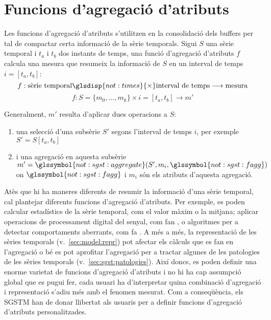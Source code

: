 
\section{Funcions d'agregació d'atributs}
\label{sec:model:interpolador}
\label{sec:model:agregador}


Les funcions d'agregació d'atributs s'utilitzen en la consolidació
dels buffers per tal de compactar certa informació de la sèrie
temporals. Sigui $S$ una sèrie temporal i $t_a$ i $t_b$ dos instants
de temps, una funció d'agregació d'atributs $f$ calcula una mesura que
resumeix la informació de $S$ en un interval de temps $i=[t_a,t_b]$:
\[
f: \text{sèrie temporal} \glsdisp{not:times}{\times}
\text{interval de temps} \longrightarrow \text{mesura}
\]
\[
f: S=\{m_0,\dotsc,m_k\} \times i=[t_a,t_b] \longrightarrow  m'
\]


Generalment, $m'$ resulta d'aplicar dues operacions a $S$: 
\begin{enumerate}
\item una selecció d'una subsèrie $S'$ segons l'interval de temps $i$,
  per exemple $S' = S[t_a,t_b]$
\item i una agregació en aquesta subsèrie $m' =
  \glssymbol{not:sgst:aggregate}(S',m_i,\glssymbol{not:sgst:fagg})$ on
  $\glssymbol{not:sgst:fagg}$ i $m_i$ són els atributs d'aquesta agregació.
\end{enumerate}



Atès que hi ha maneres diferents de resumir la informació d'una sèrie
temporal, cal plantejar diferents funcions d'agregació d'atributs. Per
exemple, es poden calcular estadístics de la sèrie temporal, com el
valor màxim o la mitjana; aplicar operacions de processament digital
del senyal, com fan \textcite{zhang11}, o algoritmes per a detectar
comportaments aberrants, com fa \textcite{lisa00:brutlag}. A més a
més, la representació de les sèries temporals
(v.~\autoref{sec:model:repr}) pot afectar els càlculs que es fan en
l'agregació o bé es pot aprofitar l'agregació per a tractar algunes de
les patologies de les sèries temporals
(v.~\autoref{sec:sgst:patologies}).  Així doncs, es poden definir una
enorme varietat de funcions d'agregació d'atributs i no hi ha cap
assumpció global que es pugui fer, cada usuari ha d'interpretar quina
combinació d'agregació i representació s'adiu més amb el fenomen
mesurat. Com a conseqüència, els \gls{SGSTM} han de donar llibertat
als usuaris per a definir funcions d'agregació d'atributs
personalitzades.


